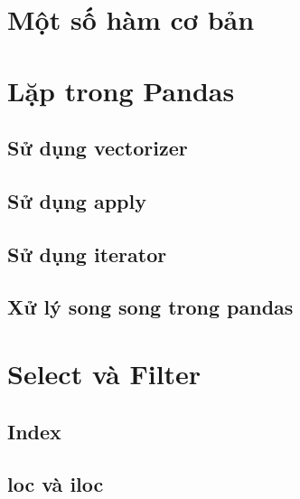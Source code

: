 \documentclass[
]{book}
\begin{document}
\hypertarget{mux1ed9t-sux1ed1-huxe0m-cux1a1-bux1ea3n}{%
\chapter{Một số hàm cơ bản}\label{mux1ed9t-sux1ed1-huxe0m-cux1a1-bux1ea3n}}

\hypertarget{lux1eb7p-trong-pandas}{%
\chapter{Lặp trong Pandas}\label{lux1eb7p-trong-pandas}}

\hypertarget{sux1eed-dux1ee5ng-vectorizer}{%
\section{Sử dụng vectorizer}\label{sux1eed-dux1ee5ng-vectorizer}}

\hypertarget{sux1eed-dux1ee5ng-apply}{%
\section{Sử dụng apply}\label{sux1eed-dux1ee5ng-apply}}

\hypertarget{sux1eed-dux1ee5ng-iterator}{%
\section{Sử dụng iterator}\label{sux1eed-dux1ee5ng-iterator}}

\hypertarget{xux1eed-luxfd-song-song-trong-pandas}{%
\section{Xử lý song song trong pandas}\label{xux1eed-luxfd-song-song-trong-pandas}}

\hypertarget{select-vuxe0-filter}{%
\chapter{Select và Filter}\label{select-vuxe0-filter}}

\hypertarget{index}{%
\section{Index}\label{index}}

\hypertarget{loc-vuxe0-iloc}{%
\section{loc và iloc}\label{loc-vuxe0-iloc}}
\end{document}
